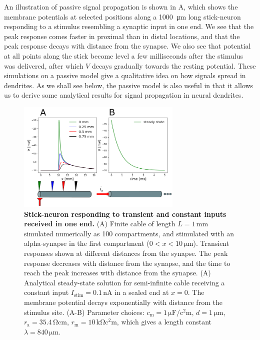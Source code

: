 An illustration of passive signal propagation is shown in A, which shows the membrane potentials at selected positions along a 1000~\si{\micro\metre} long stick-neuron responding to a stimulus resembling a synaptic input in one end. We see that the peak response comes faster in proximal than in distal locations, and that the peak response decays with distance from the synapse. We also see that potential at all points along the stick become level a few milliseconds after the stimulus was delivered, after which $V$ decays gradually towards the resting potential. These simulations on a passive model give a qualitative idea on how signals spread in dendrites. As we shall see below, the passive model is also useful in that it allows us to derive some analytical results for signal propagation in neural dendrites.

\begin{figure}[!ht]
\begin{center}
\includegraphics[width=0.7\textwidth]{Figures/Neuron/Cablesims.png}
\end{center}
\caption{\textbf{Stick-neuron responding to transient and constant inputs received in one end.} (A) Finite cable of length $L = 1 \, \si{\milli\metre}$ simulated numerically as 100 compartments, and stimulated with an alpha-synapse in the first compartment ($0<x<10 \, \si{\micro\metre}$). Transient responses shown at different distances from the synapse. The peak response decreases with distance from the synapse, and the time to reach the peak increases with distance from the synapse.
(A) Analytical steady-state solution for semi-infinite cable receiving a constant input $I_\text{stim} = 0.1 \, \si{\nano\ampere}$ in a sealed end at $x=0$. The membrane potential decays exponentially with distance from the stimulus site.  (A-B) Parameter choices: $c_\text{m}=1\, \si{\micro\farad\per\square\centi\metre}$, $d = 1\, \si{\micro\metre}$, $r_\text{a}=35.4\, \si{\ohm\centi\metre}$, $r_\text{m} = 10 \, \si{\kilo\ohm\square\centi\metre}$, which gives a length constant $\lambda = 840\, \si{\micro\metre}$.}
\label{fig:Neuron:Semiinf}
\end{figure}


